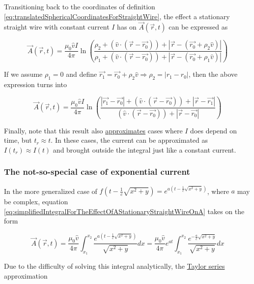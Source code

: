 ﻿\documentclass{article}
\begin{document}
Transitioning back to the coordinates of definition \ref{eq:translatedSphericalCoordinatesForStraightWire}, the effect a stationary straight wire with constant current $I$ has on $\vec{A}(\vec{r}, t)$ can be expressed as

\begin{equation}
    \label{eq:effectOfStationaryStraightWireWithConstantCurrentOnA}
    \vec{A}(\vec{r}, t) = \frac{\mu_0 \hat{v} I}{4 \pi} \ln \left( \frac{\rho_2 + (\hat{v} \cdot (\vec{r} - \vec{r_0})) + |\vec{r} - (\vec{r_0} + \rho_2 \hat{v})|}{\rho_1 + (\hat{v} \cdot (\vec{r} - \vec{r_0})) + |\vec{r} - (\vec{r_0} + \rho_1 \hat{v})|} \right)
\end{equation}

If we assume $\rho_1 = 0$ and define $\vec{r_1} = \vec{r_0} + \rho_2 \hat{v} \Rightarrow \rho_2 = |r_1 - r_0|$, then the above expression turns into

\begin{equation*}
    \vec{A}(\vec{r}, t) = \frac{\mu_0 \hat{v} I}{4 \pi} \ln \left( \frac{|\vec{r_1} - \vec{r_0}| + (\hat{v} \cdot (\vec{r} - \vec{r_0})) + |\vec{r} - \vec{r_1}|}{(\hat{v} \cdot (\vec{r} - \vec{r_0})) + |\vec{r} - \vec{r_0}|} \right)
\end{equation*}

Finally, note that this result also \href{https://en.wikipedia.org/wiki/Approximation}{approximates} cases where $I$ does depend on time, but $t_r \approx t$. In these cases, the current can be approximated as $I(t_r) \approx I(t)$ and brought outside the integral just like a constant current.

\subsubsection{The not-so-special case of exponential current}

In the more generalized case of $f(t - \frac{1}{c} \sqrt{x^2 + y}) = e^{a(t - \frac{1}{c} \sqrt{x^2 + y})}$, where $a$ may be complex, equation \ref{eq:simplifiedIntegralForTheEffectOfAStationaryStraightWireOnA} takes on the form

\begin{equation*}
    \vec{A}(\vec{r}, t) = \frac{\mu_0 \hat{v}}{4 \pi} \int_{x_1}^{x_2} \frac{e^{a(t - \frac{1}{c} \sqrt{x^2 + y})}}{\sqrt{x^2 + y}} dx = \frac{\mu_0 \hat{v}}{4 \pi} e^{at} \int_{x_1}^{x_2} \frac{e^{- \frac{a}{c} \sqrt{x^2 + y}}}{\sqrt{x^2 + y}} dx
\end{equation*}

Due to the difficulty of solving this integral analytically, the \href{https://en.wikipedia.org/wiki/Taylor_series}{Taylor series} approximation
\end{document}
